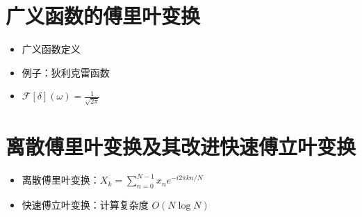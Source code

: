 \documentclass[12pt,a4paper]{article}
\begin{document}
	\section{广义函数的傅里叶变换}
	\begin{itemize}
		\item 广义函数定义
		\item 例子：狄利克雷函数
		\item \(\mathcal{F}[\delta](\omega) = \frac{1}{\sqrt{2\pi}}\)
	\end{itemize}
	
	\section{离散傅里叶变换及其改进快速傅立叶变换}
	\begin{itemize}
		\item 离散傅里叶变换：\(X_k = \sum_{n=0}^{N-1} x_n e^{-i2\pi kn/N}\)
		\item 快速傅立叶变换：计算复杂度 \(O(N \log N)\)
	\end{itemize}
	
\end{document}
